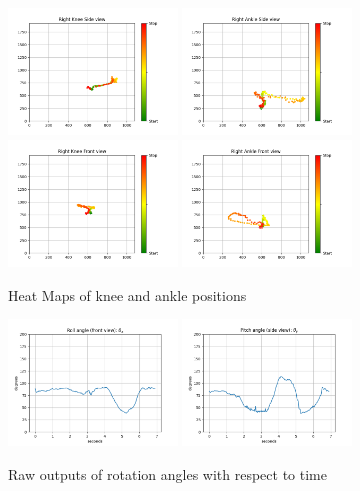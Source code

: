 \documentclass[conference]{IEEEtran}
\begin{document}
\begin{figure}[H]
  \centering
  \includegraphics[width=0.4\textwidth]{figures/figure_1.png}
  \includegraphics[width=0.4\textwidth]{figures/figure_2.png}
  \includegraphics[width=0.4\textwidth]{figures/figure_3.png}
  \includegraphics[width=0.4\textwidth]{figures/figure_4.png}
  \caption{Heat Maps of knee and ankle positions}
  \label{fig:heat}
\end{figure}

\begin{figure}[htbp]
  \centering
  \includegraphics[width=0.4\textwidth]{figures/figure_5.png}
  \includegraphics[width=0.4\textwidth]{figures/figure_6.png}
  \caption{Raw outputs of rotation angles with respect to time}
  \label{fig:angles}
\end{figure}
\end{document}

